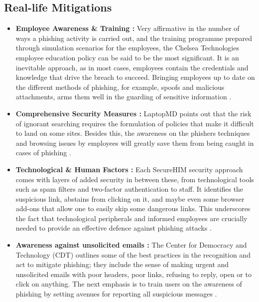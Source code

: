 \subsection{Real-life Mitigations} 

\begin{itemize}
    \item \textbf{Employee Awareness \& Training :} Very affirmative in the number of ways a phishing activity is carried out, and the training programme prepared through simulation scenarios for the employees, the Chelsea Technologies employee education policy can be said to be the most significant. It is an inevitable approach, as in most cases, employees contain the credentials and knowledge that drive the breach to succeed. Bringing employees up to date on the different methods of phishing, for example, spoofs and malicious attachments, arms them well in the guarding of sensitive information \cite{DigitalGuardianPhishingPrevention}.

     \item \textbf{Comprehensive Security Measures :} LaptopMD points out that the risk of ignorant searching requires the formulation of policies that make it difficult to land on some sites. Besides this, the awareness on the phishers techniques and browsing issues by employees will greatly save them from being caught in cases of phishing \cite{DigitalGuardianPhishingPrevention}.
     
     \item \textbf{Technological \& Human Factors :} Each SecureHIM security approach comes with layers of added security in between these, from technological tools such as spam filters and two-factor authentication to staff. It identifies the suspicious link, abstains from clicking on it, and maybe even some browser add-ons that allow one to easily skip some dangerous links. This underscores the fact that technological peripherals and informed employees are crucially needed to provide an effective defence against phishing attacks \cite{DigitalGuardianPhishingPrevention}.

     \item \textbf{Awareness against unsolicited emails :} The Center for Democracy and Technology (CDT) outlines some of the best practices in the recognition and act to mitigate phishing; they include the sense of making urgent and unsolicited emails with poor headers, poor links, refusing to reply, open or to click on anything. The next emphasis is to train users on the awareness of phishing by setting avenues for reporting all suspicious messages \cite{CDTPhishingMitigation}.
     
     
\end{itemize}


